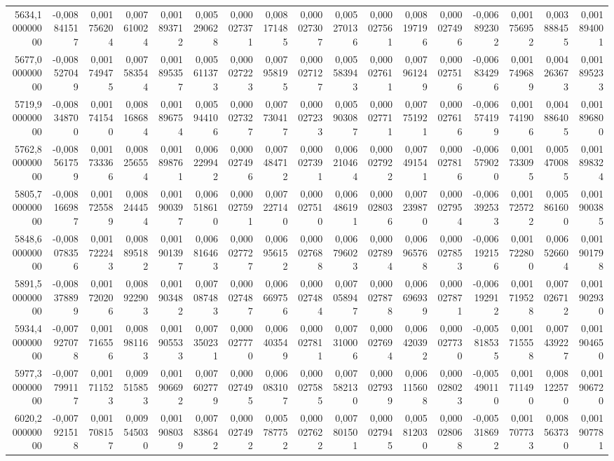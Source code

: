 \begin{longtable}{rrrrrrrrrrrrrrrrr}
5634,100000000 & -0,008841517 & 0,001756204 & 0,007610024 & 0,001893712 & 0,005290628 & 0,000027371 & 0,008171485 & 0,000027307 & 0,005270136 & 0,000027561 & 0,008197196 & 0,000027496 & -0,006892302 & 0,001756952 & 0,003888455 & 0,001894001\\
5677,000000000 & -0,008527049 & 0,001749475 & 0,007583544 & 0,001895357 & 0,005611373 & 0,000027223 & 0,007958195 & 0,000027127 & 0,005583943 & 0,000027611 & 0,007961249 & 0,000027516 & -0,006834296 & 0,001749689 & 0,004263673 & 0,001895233\\
5719,900000000 & -0,008348700 & 0,001741540 & 0,008168684 & 0,001896754 & 0,005944106 & 0,000027327 & 0,007730417 & 0,000027233 & 0,005903087 & 0,000027711 & 0,007751921 & 0,000027616 & -0,006574199 & 0,001741906 & 0,004886405 & 0,001896800\\
5762,800000000 & -0,008561759 & 0,001733366 & 0,008256554 & 0,001898761 & 0,006229942 & 0,000027496 & 0,007484712 & 0,000027391 & 0,006210464 & 0,000027922 & 0,007491541 & 0,000027816 & -0,006579020 & 0,001733095 & 0,005470085 & 0,001898324\\
5805,700000000 & -0,008166987 & 0,001725589 & 0,008244454 & 0,001900397 & 0,006518610 & 0,000027591 & 0,007227140 & 0,000027510 & 0,006486191 & 0,000028036 & 0,007239870 & 0,000027954 & -0,006392533 & 0,001725722 & 0,005861600 & 0,001900385\\
5848,600000000 & -0,008078356 & 0,001722243 & 0,008895182 & 0,001901397 & 0,006816463 & 0,000027727 & 0,006956152 & 0,000027688 & 0,006796023 & 0,000027894 & 0,006965768 & 0,000027853 & -0,006192156 & 0,001722800 & 0,006526604 & 0,001901798\\
5891,500000000 & -0,008378899 & 0,001720206 & 0,008922903 & 0,001903482 & 0,007087483 & 0,000027487 & 0,006669756 & 0,000027484 & 0,007058947 & 0,000027878 & 0,006696939 & 0,000027871 & -0,006192912 & 0,001719528 & 0,007026712 & 0,001902930\\
5934,400000000 & -0,007927078 & 0,001716556 & 0,008981163 & 0,001905533 & 0,007350231 & 0,000027770 & 0,006403549 & 0,000027811 & 0,007310006 & 0,000027694 & 0,006420392 & 0,000027730 & -0,005818535 & 0,001715558 & 0,007439227 & 0,001904650\\
5977,300000000 & -0,007799117 & 0,001711523 & 0,009515853 & 0,001906692 & 0,007602779 & 0,000027495 & 0,006083107 & 0,000027585 & 0,007582130 & 0,000027939 & 0,006115608 & 0,000028023 & -0,005490110 & 0,001711490 & 0,008122570 & 0,001906720\\
6020,200000000 & -0,007921518 & 0,001708157 & 0,009545030 & 0,001908039 & 0,007838642 & 0,000027492 & 0,005787752 & 0,000027622 & 0,007801501 & 0,000027945 & 0,005812030 & 0,000028068 & -0,005318692 & 0,001707733 & 0,008563730 & 0,001907781\\

\end{longtable}
